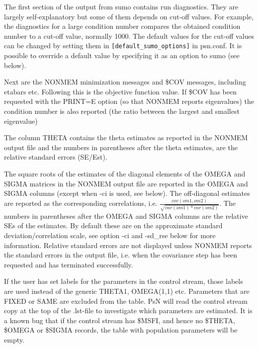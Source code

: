 The first section of the output from sumo contains run diagnostics. They are largely self-explanatory but some of them depends on cut-off values. For example, the diagnostics for a large condition number compares the obtained condition number to a cut-off value, normally 1000. The default values for the cut-off values can be changed by setting them in 
\verb|[default_sumo_options]| in psn.conf. It is possible to override a default value by specifying it as an option to sumo (see below).

Next are the NONMEM minimization messages and \$COV messages, including etabars etc. Following this is the objective function value. If \$COV has been requested with the PRINT=E option (so that NONMEM reports eigenvalues) the condition number is also reported (the ratio between the largest and smallest eigenvalue)

The column THETA contains the theta estimates as reported in the NONMEM output file and the numbers in parentheses after the theta estimates, are the relative standard errors (SE/Est). 

The square roots of the estimates of the diagonal elements of the OMEGA and SIGMA matrices in the NONMEM output file are reported in the OMEGA and SIGMA columns (except when -ci is used, see below). The off-diagonal estimates are reported as the corresponding correlations, i.e. 
$\frac{cov(om1,om2)}{\sqrt{var(om1)*var(om2)}}$. 
The numbers in parentheses after the OMEGA and SIGMA columns are the relative SEs of the estimates. By default these are on the approximate standard deviation/correlation scale, see option -ci and -sd\_rse below for more information.
Relative standard errors are not displayed unless NONMEM reports the standard errors in the output file, i.e. when the covariance step has been requested and has terminated successfully.

If the user has set labels for the parameters in the control stream, those labels are used instead of the
generic THETA1, OMEGA(1,1) etc. Parameters that are FIXED or SAME are excluded from the table.
PsN will read the control stream copy at the top of the .lst-file to investigate which parameters are estimated. It is a known
bug that if the control stream has \$MSFI, and hence no \$THETA, \$OMEGA or \$SIGMA records, the table with population parameters will be empty.


